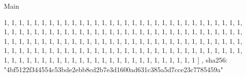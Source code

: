 \begin{lexlean}{Main}
\begin{semanticmodule}
{{      1,
      1,
      1,
      1,
      1,
      1,
      1,
      1,
      1,
      1,
      1,
      1,
      1,
      1,
      1,
      1,
      1,
      1,
      1,
      1,
      1,
      1,
      1,
      1,
      1,
      1,
      1,
      1,
      1,
      1,
      1,
      1,
      1,
      1,
      1,
      1,
      1,
      1,
      1,
      1,
      1,
      1,
      1,
      1,
      1,
      1,
      1,
      1,
      1,
      1,
      1,
      1,
      1,
      1,
      1,
      1,
      1,
      1,
      1,
      1,
      1,
      1,
      1,
      1,
      1,
      1,
      1,
      1,
      1,
      1,
      1,
      1,
      1,
      1,
      1,
      1,
      1,
      1,
      1,
      1,
      1,
      1,
      1,
      1,
      1,
      1,
      1,
      1,
      1,
      1,
      1,
      1,
      1,
      1,
      1,
      1,
      1,
      1,
      1,
      1,
      1,
      1,
      1,
      1,
      1,
      1,
      1,
      1,
      1,
      1,
      1,
      1,
      1,
      1,
      1,
      1,
      1,
      1,
      1,
      1,
      1,
      1,
      1,
      1,
      1,
      1,
      1,
      1,
      1,
      1,
      1,
      1,
      1,
      1,
      1,
      1,
      1,
      1,
      1,
      1,
      1,
      1,
      1,
      1,
      1,
      1,
      1,
      1,
      1,
      1,
      1,
      1,
      1,
      1
    ]
  },
  sha256: "4bf5122f344554c53bde2ebb8cd2b7e3d1600ad631c385a5d7cce23c7785459a"
}
\end{semanticmodule}
\end{lexlean}
